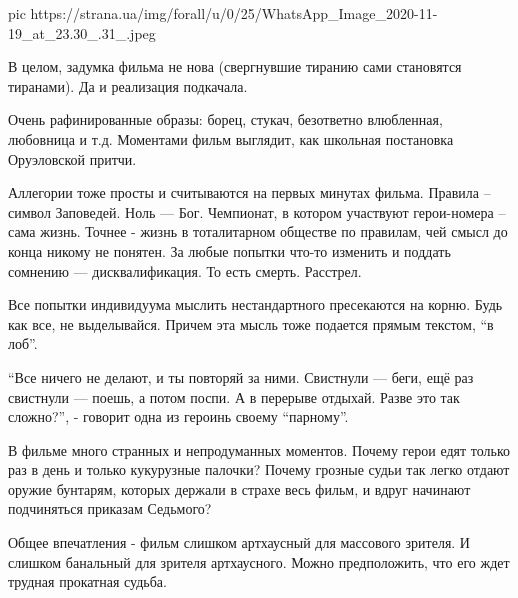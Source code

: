 \ifcmt
pic https://strana.ua/img/forall/u/0/25/WhatsApp_Image_2020-11-19_at_23.30_.31_.jpeg
\fi

В целом, задумка фильма не нова (свергнувшие тиранию сами становятся
тиранами). Да и реализация подкачала.

Очень рафинированные образы: борец, стукач, безответно влюбленная,
любовница и т.д. Моментами фильм выглядит, как школьная постановка
Оруэловской притчи.

Аллегории тоже просты и считываются на первых минутах фильма. Правила –
символ Заповедей. Ноль --- Бог. Чемпионат, в котором участвуют герои-номера
– сама жизнь. Точнее - жизнь в тоталитарном обществе по правилам, чей
смысл до конца никому не понятен. За любые попытки что-то изменить и
поддать сомнению --- дисквалификация. То есть смерть. Расстрел.

Все попытки индивидуума мыслить нестандартного пресекаются на корню. Будь
как все, не выделывайся. Причем эта мысль тоже подается прямым текстом, \enquote{в
лоб}.

\enquote{Все ничего не делают, и ты повторяй за ними. Свистнули --- беги, ещё раз
свистнули --- поешь, а потом поспи. А в перерыве отдыхай. Разве это так
сложно?}, - говорит одна из героинь своему 
\enquote{парному}.

В фильме много странных и непродуманных моментов. Почему герои едят только
раз в день и только кукурузные палочки? Почему грозные судьи так легко
отдают оружие бунтарям, которых держали в страхе весь фильм, и вдруг
начинают подчиняться приказам Седьмого?

Общее впечатления - фильм слишком артхаусный для массового зрителя. И
слишком банальный для зрителя артхаусного. Можно предположить, что его
ждет трудная прокатная судьба.
